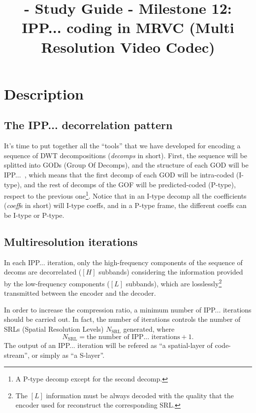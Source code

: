 
\title{\SM{} - Study Guide - Milestone 12: IPP... coding in MRVC (Multi Resolution Video Codec)}

\maketitle

\section{Description}

\subsection{The IPP... decorrelation pattern}
It's time to put together all the ``tools'' that we have developed for
encoding a sequence of DWT decompositions (\emph{decomps} in
short). First, the sequence will be splitted into GODs (Group Of
Decomps), and the structure of each GOD will be
IPP...~\cite{le1991mpeg}, which means that the first decomp of each
GOD will be intra-coded (I-type), and the rest of decomps of the GOF
will be predicted-coded (P-type), respect to the previous
one\footnote{A P-type decomp except for the second decomp.}. Notice
that in an I-type decomp all the coefficients (\emph{coeff}s in short)
will I-type coeffs, and in a P-type frame, the different coeffs can be
I-type or P-type.

\subsection{Multiresolution iterations}
In each IPP... iteration, only the high-frequency components of the
sequence of decoms are decorrelated ($[H]$ subbands) considering the
information provided by the low-frequency components ($[L]$ subbands),
which are losslessly\footnote{The $[L]$ information must be always
decoded with the quality that the encoder used for reconstruct the
corresponding SRL.} transmitted between the encoder and the decoder.

In order to increase the compression ratio, a minimum number of
IPP... iterations should be carried out. In fact, the number of
iterations controls the number of SRLs (Spatial Resolution Levels)
$N_{\text{SRL}}$ generated, where
\begin{equation}
  N_{\text{SRL}} = \text{the number of IPP... iterations} + 1.
\end{equation}
The output of an IPP... iteration will be refered as ``a
spatial-layer of code-stream'', or simply as ``a S-layer''.

